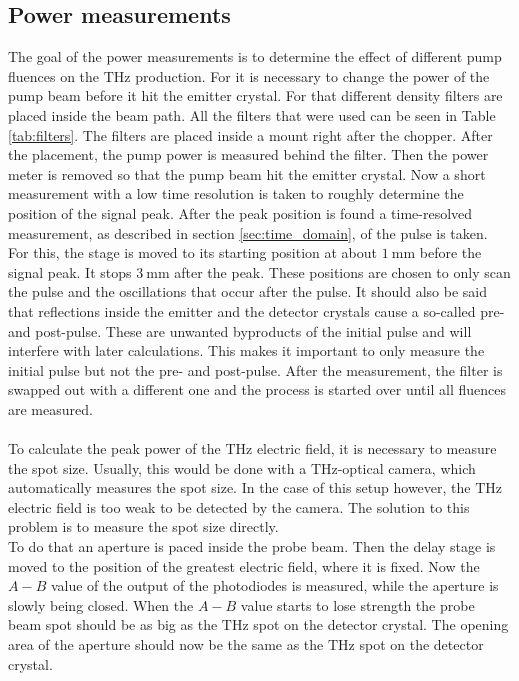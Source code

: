 \subsection{Power measurements}
\label{sec:power}
The goal of the power measurements is to determine the effect of different pump fluences on the $\si{\tera\hertz}$ production.
For it is necessary to change the power of the pump beam before it hit the emitter crystal.
For that different density filters are placed inside the beam path.
All the filters that were used can be seen in Table \ref{tab:filters}.
The filters are placed inside a mount right after the chopper.
After the placement, the pump power is measured behind the filter.
Then the power meter is removed so that the pump beam hit the emitter crystal.
Now a short measurement with a low time resolution is taken to roughly determine the position of the signal peak.
After the peak position is found a time-resolved measurement, as described in section \ref{sec:time_domain}, of the pulse is taken.
For this, the stage is moved to its starting position at about $\SI{1}{\milli\meter}$ before the signal peak.
It stops $\SI{3}{\milli\meter}$ after the peak.
These positions are chosen to only scan the pulse and the oscillations that occur after the pulse.
It should also be said that reflections inside the emitter and the detector crystals cause a so-called pre- and post-pulse.
These are unwanted byproducts of the initial pulse and will interfere with later calculations.
This makes it important to only measure the initial pulse but not the pre- and post-pulse.
After the measurement, the filter is swapped out with a different one and the process is started over until all fluences are measured.
\\\\
To calculate the peak power of the $\si{\tera\hertz}$ electric field, it is necessary to measure the spot size.
Usually, this would be done with a $\si{\tera\hertz}$-optical camera, which automatically measures the spot size.
In the case of this setup however, the $\si{\tera\hertz}$ electric field is too weak to be detected by the camera.
The solution to this problem is to measure the spot size directly.
\\
To do that an aperture is paced inside the probe beam.
Then the delay stage is moved to the position of the greatest electric field, where it is fixed.
Now the $A-B$ value of the  output of the photodiodes is measured, while the aperture is slowly being closed.
When the $A-B$ value starts to lose strength the probe beam spot should be as big as the $\si{\tera\hertz}$ spot on the detector crystal.
The opening area of the aperture should now be the same as the $\si{\tera\hertz}$ spot on the detector crystal.
